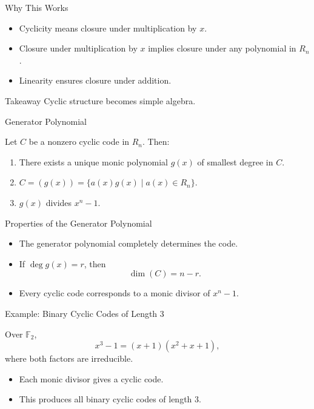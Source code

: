 \documentclass[aspectratio=169,xcolor=dvipsnames]{beamer}
\begin{document}
	\begin{frame}{Why This Works}
		
		\begin{itemize}
			\item Cyclicity means closure under multiplication by $x$.
			\item Closure under multiplication by $x$ implies closure under any
			polynomial in $R_n$.
			\item Linearity ensures closure under addition.
		\end{itemize}
		
		\begin{alertblock}{Takeaway}
			Cyclic structure becomes simple algebra.
		\end{alertblock}
		
	\end{frame}
	
	\begin{frame}{Generator Polynomial}
		
		\begin{theorem}
			Let $C$ be a nonzero cyclic code in $R_n$. Then:
			\begin{enumerate}
				\item There exists a unique \alert{monic} polynomial $g(x)$ of smallest degree in $C$.
				\item $C = (g(x)) = \{a(x)g(x) \mid a(x) \in R_n\}$.
				\item $g(x)$ divides $x^n - 1$.
			\end{enumerate}
		\end{theorem}
		
	\end{frame}
	
	\begin{frame}{Properties of the Generator Polynomial}
		
		\begin{itemize}
			\item The generator polynomial completely determines the code.
			\item If $\deg g(x) = r$, then
			\[
			\dim(C) = n - r.
			\]
			\item Every cyclic code corresponds to a monic divisor of $x^n - 1$.
		\end{itemize}
		
	\end{frame}
	
	\begin{frame}{Example: Binary Cyclic Codes of Length 3}
		
		Over $\mathbb{F}_2$,
		\[
		x^3 - 1 = (x + 1)(x^2 + x + 1),
		\]
		where both factors are irreducible.
		
		\begin{itemize}
			\item Each monic divisor gives a cyclic code.
			\item This produces all binary cyclic codes of length $3$.
		\end{itemize}
		
	\end{frame}
	
\end{document}
